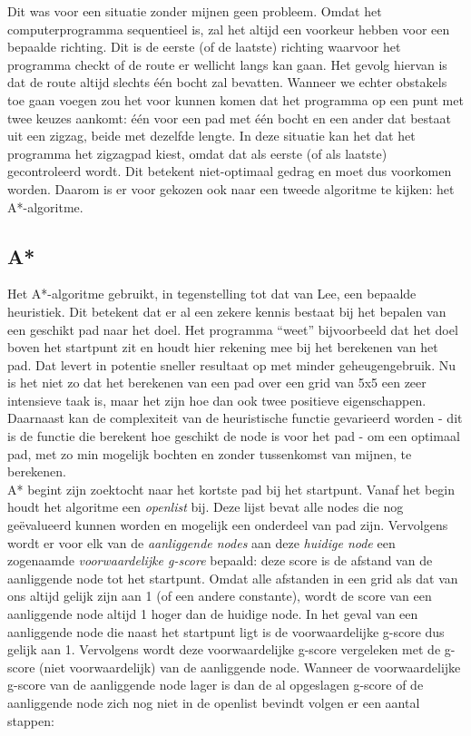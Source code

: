 \documentclass{report}
\begin{document}
Dit was voor een situatie zonder mijnen geen probleem.
Omdat het computerprogramma sequentieel is, zal het altijd een voorkeur hebben voor een bepaalde richting.
Dit is de eerste (of de laatste) richting waarvoor het programma checkt of de route er wellicht langs kan gaan.
Het gevolg hiervan is dat de route altijd slechts één bocht zal bevatten.
Wanneer we echter obstakels toe gaan voegen zou het voor kunnen komen dat het programma op een punt met twee keuzes aankomt: één voor een pad met één bocht en een ander dat bestaat uit een zigzag, beide met dezelfde lengte.
In deze situatie kan het dat het programma het zigzagpad kiest, omdat dat als eerste (of als laatste) gecontroleerd wordt.
Dit betekent niet-optimaal gedrag en moet dus voorkomen worden.
Daarom is er voor gekozen ook naar een tweede algoritme te kijken: het A*-algoritme.

\subsection{A*}
\label{ssec:astar}

Het A*-algoritme gebruikt, in tegenstelling tot dat van Lee, een bepaalde heuristiek.
Dit betekent dat er al een zekere kennis bestaat bij het bepalen
van een geschikt pad naar het doel.
Het programma ``weet'' bijvoorbeeld dat het doel boven het startpunt zit en houdt hier rekening mee bij het berekenen van het pad.
Dat levert in potentie sneller resultaat op met minder geheugengebruik.
Nu is het niet zo dat het berekenen van een pad over een grid van 5x5 een zeer intensieve taak is, maar het zijn hoe dan ook twee positieve eigenschappen.
Daarnaast kan de complexiteit van de heuristische functie gevarieerd worden - dit is de functie die berekent hoe geschikt de node is voor het pad - om een optimaal pad, met zo min mogelijk bochten en zonder tussenkomst van mijnen, te berekenen.\\

A* begint zijn zoektocht naar het kortste pad bij het startpunt.
Vanaf het begin houdt het algoritme een \textit{openlist} bij.
Deze lijst bevat alle nodes die nog geëvalueerd kunnen worden en mogelijk een onderdeel van pad zijn.
Vervolgens wordt er voor elk van de \textit{aanliggende nodes} aan deze \textit{huidige node} een zogenaamde \textit{voorwaardelijke g-score} bepaald: deze score is de afstand van de aanliggende node tot het startpunt.
Omdat alle afstanden in een grid als dat van ons altijd gelijk zijn aan 1 (of een andere constante), wordt de score van een aanliggende node altijd 1 hoger dan de huidige node.
In het geval van een aanliggende node die naast het startpunt ligt is de voorwaardelijke g-score dus gelijk aan 1.
Vervolgens wordt deze voorwaardelijke g-score vergeleken met de g-score (niet voorwaardelijk) van de aanliggende node.
Wanneer de voorwaardelijke g-score van de aanliggende node lager is dan de al opgeslagen g-score of de aanliggende node zich nog niet in de openlist bevindt volgen er een aantal stappen:
\end{document}
